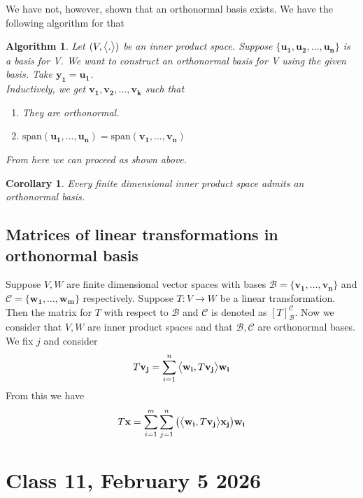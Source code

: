 \documentclass{article}
\newtheorem{corollary}{Corollary}
\newtheorem{algorithm}{Algorithm}
\begin{document}
We have not, however, shown that an orthonormal basis exists. We have the following algorithm for that 
\begin{algorithm}
Let $(V,\big{<}.\big{>})$ be an inner product space. Suppose $\{\mathbf{u_1},\mathbf{u_2},\dots,\mathbf{u_n}\}$ is a basis for  V.
We want to construct an orthonormal basis for V using the given basis. Take $\mathbf{y_1}=\mathbf{u_1}$.
\\Inductively, we get $\mathbf{v_1},\mathbf{v_2},\dots,\mathbf{v_k}$ such that 
\begin{enumerate}
    \item They are orthonormal.
    \item $\text{span}(\mathbf{u_1},\dots,\mathbf{u_n})=\text{span}(\mathbf{v_1},\dots,\mathbf{v_n})$
\end{enumerate} 
From here we can proceed as shown above. 
\end{algorithm}
\begin{corollary}
    Every finite dimensional inner product space admits an orthonormal basis.
\end{corollary}
\subsection*{Matrices of linear transformations in orthonormal basis}
Suppose $V,W$ are finite dimensional vector spaces with bases $\mathcal{B}=\{\mathbf{v_1},\dots,\mathbf{v_n}\}$ and $\mathcal{C}=\{\mathbf{w_1},\dots,\mathbf{w_m}\}$ respectively. Suppose $T:V\to W$ be a linear transformation. Then the matrix for $T$ with respect to $\mathcal{B}$ and $\mathcal{C}$ is denoted as ${[T]^{\mathcal{C}}_{\mathcal{B}}}$. 
Now we consider that $V,W$ are inner product spaces and that $\mathcal{B},\mathcal{C}$ are orthonormal bases. 
We fix $j$ and consider 
$$T\mathbf{v_j}=\sum_{i=1}^{n}\big{<}\mathbf{w_i},T\mathbf{v_j}\big{>}\mathbf{w_i}$$ 
From this we have
$$T\mathbf{x}=\sum_{i=1}^{m}\sum_{j=1}^{n}\big{(}\big{<}\mathbf{w_i},T\mathbf{v_j}\big{>}\mathbf{x_j}\big{)}\mathbf{w_i}$$
\section*{Class 11, February 5 2026}
\end{document}
